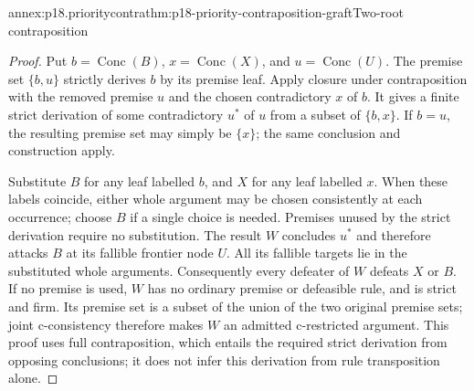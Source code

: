 \begin{annexitem}{annex:p18.prioritycontra}{thm:p18-priority-contraposition-graft}{Two-root contraposition}
\begin{proof}
Put \(b=\operatorname{Conc}(B)\), \(x=\operatorname{Conc}(X)\),
and \(u=\operatorname{Conc}(U)\).
The premise set \(\{b,u\}\) strictly derives \(b\) by its premise leaf.
Apply closure under contraposition with the removed premise \(u\)
and the chosen contradictory \(x\) of \(b\).
It gives a finite strict derivation of some contradictory \(u^\ast\)
of \(u\) from a subset of \(\{b,x\}\).
If \(b=u\), the resulting premise set may simply be \(\{x\}\);
the same conclusion and construction apply.

Substitute \(B\) for any leaf labelled \(b\), and \(X\) for any leaf
labelled \(x\). When these labels coincide, either whole argument may
be chosen consistently at each occurrence; choose \(B\) if a single
choice is needed. Premises unused by the strict derivation require
no substitution. The result \(W\) concludes \(u^\ast\) and therefore
attacks \(B\) at its fallible frontier node \(U\).
All its fallible targets lie in the substituted whole arguments.
Consequently every defeater of \(W\) defeats \(X\) or \(B\).
If no premise is used, \(W\) has no ordinary premise or defeasible rule,
and is strict and firm.
Its premise set is a subset of the union of the two original premise
sets; joint c-consistency therefore makes \(W\) an admitted c-restricted
argument. This proof uses full contraposition, which entails the required
strict derivation from opposing conclusions; it does not infer this
derivation from rule transposition alone.
\end{proof}
\end{annexitem}

